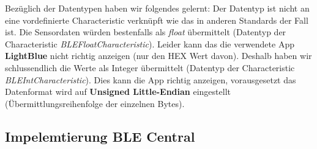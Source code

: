 \documentclass{article}
\begin{document}
Bezüglich der Datentypen haben wir folgendes gelernt: Der Datentyp ist nicht an eine vordefinierte Characteristic verknüpft wie das in anderen Standards der Fall ist. Die Sensordaten würden bestenfalls als \textit{float} übermittelt (Datentyp der Characteristic \textit{BLEFloatCharacteristic}). Leider kann das die verwendete App \textbf{LightBlue} nicht richtig anzeigen (nur den HEX Wert davon). Deshalb haben wir schlussendlich die Werte als Integer übermittelt (Datentyp der Characteristic \textit{BLEIntCharacteristic}).
Dies kann die App richtig anzeigen, vorausgesetzt das Datenformat wird auf \textbf{Unsigned Little-Endian} eingestellt (Übermittlungsreihenfolge der einzelnen Bytes).

\subsection{Impelemtierung BLE Central  }
\end{document}
